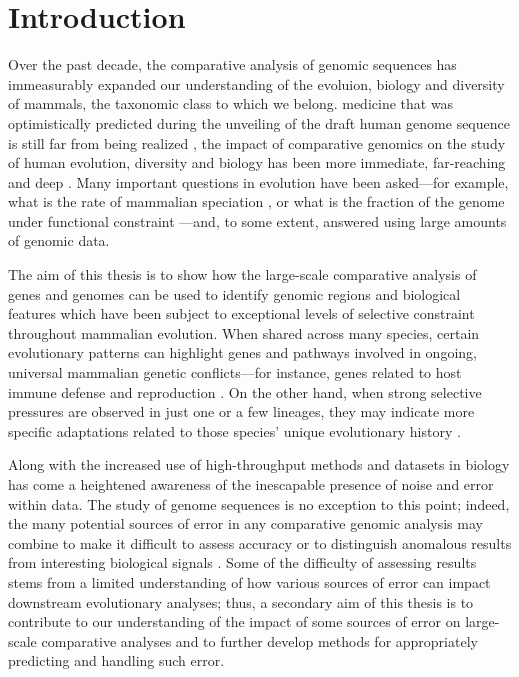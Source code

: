 \chapter{Introduction}
\label{ch_intro}
\acresetall

Over the past decade, the comparative analysis of genomic sequences
has immeasurably expanded our understanding of the evoluion, biology
and diversity of mammals, the taxonomic class to which we belong.
medicine that was optimistically predicted during the unveiling of the
draft human genome sequence is still far from being realized
\citep{Collins2001,Varmus2010}, the impact of comparative genomics on
the study of human evolution, diversity and biology has been more
immediate, far-reaching and deep \citep{OBrien1999,Lander2011}. Many
important questions in evolution have been asked---for example, what
is the rate of mammalian speciation
\citep{BinindaEmonds2007,Venditti2011}, or what is the fraction of the
genome under functional constraint
\citep{Boffelli2003a,Siepel2005,Ponting2011}---and, to some extent,
answered using large amounts of genomic data.

The aim of this thesis is to show how the large-scale comparative
analysis of genes and genomes can be used to identify genomic regions
and biological features which have been subject to exceptional levels
of selective constraint throughout mammalian evolution. When shared
across many species, certain evolutionary patterns can highlight genes
and pathways involved in ongoing, universal mammalian genetic
conflicts---for instance, genes related to host immune defense and
reproduction \citep{CastilloDavis2004}. On the other hand, when strong
selective pressures are observed in just one or a few lineages, they
may indicate more specific adaptations related to those species'
unique evolutionary history
\citep{Messier1997,Sawyer2005a,Nielsen2007}.

Along with the increased use of high-throughput methods and datasets
in biology has come a heightened awareness of the inescapable presence
of noise and error within data. The study of genome sequences is no
exception to this point; indeed, the many potential sources of error
in any comparative genomic analysis may combine to make it difficult
to assess accuracy or to distinguish anomalous results from
interesting biological signals
\citep{Mallick2009,Schneider2009,Fletcher2010,MarkovaRaina2011}. Some
of the difficulty of assessing results stems from a limited
understanding of how various sources of error can impact downstream
evolutionary analyses; thus, a secondary aim of this thesis is to
contribute to our understanding of the impact of some sources of error
on large-scale comparative analyses and to further develop methods for
appropriately predicting and handling such error.

